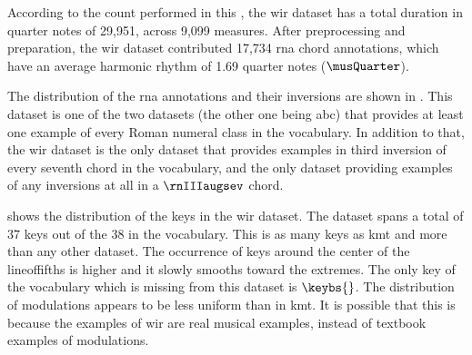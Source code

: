 
According to the count performed in this \thesisdiss{}, the
\gls{wir} dataset has a total duration in quarter notes of
29,951, across 9,099 measures. After preprocessing and
preparation, the \gls{wir} dataset contributed 17,734
\gls{rna} chord annotations, which have an average harmonic
rhythm of 1.69 quarter notes ($\musQuarter$).

The distribution of the \gls{rna} annotations and their
inversions are shown in . This
dataset is one of the two datasets (the other one being
\gls{abc}) that provides at least one example of every Roman
numeral class in the vocabulary. In addition to that, the
\gls{wir} dataset is the only dataset that provides examples
in third inversion of every seventh chord in the vocabulary,
and the only dataset providing examples of any inversions at
all in a $\rnIIIaugsev$ chord.



 shows the distribution of the keys
in the \gls{wir} dataset. The dataset spans a total of 37
keys out of the 38 in the vocabulary. This is as many keys
as \gls{kmt} and more than any other dataset. The occurrence
of keys around the center of the \gls{lineoffifths} is
higher and it slowly smooths toward the extremes. The only
key of the vocabulary which is missing from this dataset is
$\keybs{}$. The distribution of modulations appears to be less
uniform than in \gls{kmt}. It is possible that this is
because the examples of \gls{wir} are real musical examples,
instead of textbook examples of modulations.
